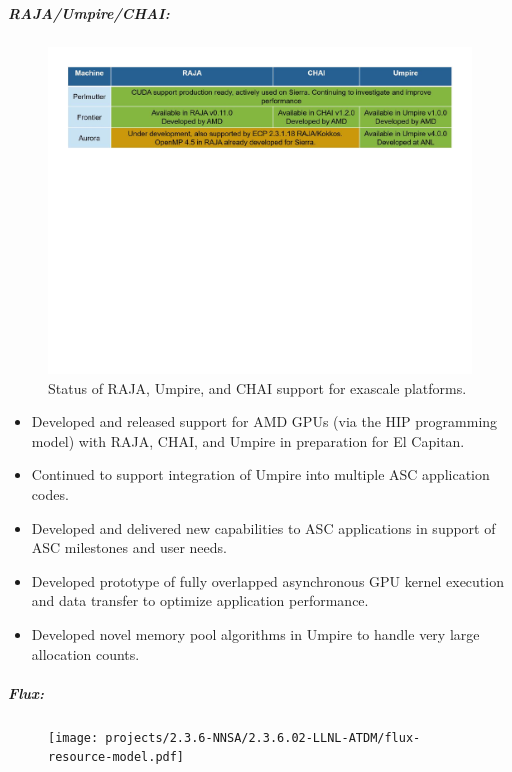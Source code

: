 \subparagraph{RAJA/Umpire/CHAI:}
\begin{figure}[htb]
\centering
\includegraphics[width=\textwidth]{projects/2.3.6-NNSA/2.3.6.02-LLNL-ATDM/raja-umpire-chai-support}
\caption{
Status of RAJA, Umpire, and CHAI support for exascale platforms.
}
\end{figure}

\begin{itemize}
\item Developed and released support for AMD GPUs (via the HIP programming model) with RAJA, CHAI, and Umpire in preparation for El Capitan. 
\item Continued to support integration of Umpire into multiple ASC application codes.
\item Developed and delivered new capabilities to ASC applications in support of ASC milestones and user needs. 
\item Developed prototype of fully overlapped asynchronous GPU kernel execution and data transfer to optimize application performance.
\item Developed novel memory pool algorithms in Umpire to handle very large allocation counts.
\end{itemize}

\subparagraph{Flux:}
\begin{figure}[tb]
\centering
\texttt{[image: projects/2.3.6-NNSA/2.3.6.02-LLNL-ATDM/flux-resource-model.pdf]}
\end{figure}

